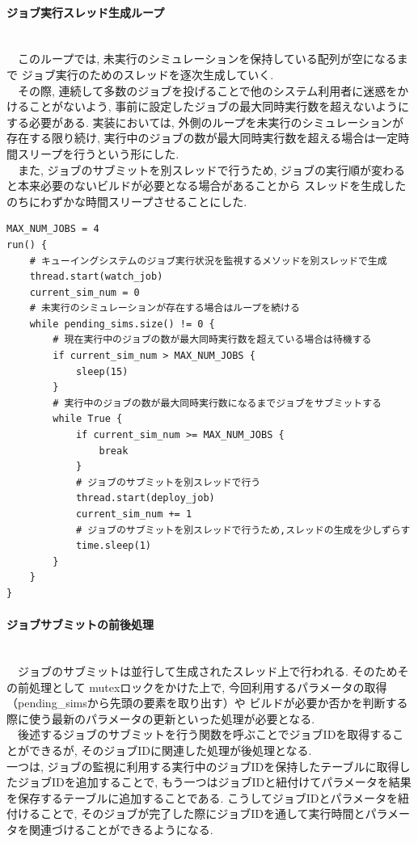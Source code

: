 \paragraph{ジョブ実行スレッド生成ループ}~\\
　このループでは, 未実行のシミュレーションを保持している配列が空になるまで
ジョブ実行のためのスレッドを逐次生成していく.\\
　その際, 連続して多数のジョブを投げることで他のシステム利用者に迷惑をかけることがないよう,
事前に設定したジョブの最大同時実行数を超えないようにする必要がある.
実装においては, 外側のループを未実行のシミュレーションが存在する限り続け,
実行中のジョブの数が最大同時実行数を超える場合は一定時間スリープを行うという形にした.\\
　また, ジョブのサブミットを別スレッドで行うため, ジョブの実行順が変わると本来必要のないビルドが必要となる場合があることから
スレッドを生成したのちにわずかな時間スリープさせることにした.\\

{\footnotesize
\begin{lstlisting}[title=ジョブ実行スレッドを生成するループ　疑似コード,frame=single]
MAX_NUM_JOBS = 4
run() {
    # キューイングシステムのジョブ実行状況を監視するメソッドを別スレッドで生成
    thread.start(watch_job)
    current_sim_num = 0
    # 未実行のシミュレーションが存在する場合はループを続ける
    while pending_sims.size() != 0 {
        # 現在実行中のジョブの数が最大同時実行数を超えている場合は待機する
        if current_sim_num > MAX_NUM_JOBS {
            sleep(15)
        }
        # 実行中のジョブの数が最大同時実行数になるまでジョブをサブミットする
        while True {
            if current_sim_num >= MAX_NUM_JOBS {
                break
            }
            # ジョブのサブミットを別スレッドで行う
            thread.start(deploy_job)
            current_sim_num += 1
            # ジョブのサブミットを別スレッドで行うため,スレッドの生成を少しずらす
            time.sleep(1)
        }
    }
}
\end{lstlisting}
}

\paragraph{ジョブサブミットの前後処理}~\\
　ジョブのサブミットは並行して生成されたスレッド上で行われる. そのためその前処理として
mutexロックをかけた上で, 今回利用するパラメータの取得（pending\_simsから先頭の要素を取り出す）や
ビルドが必要か否かを判断する際に使う最新のパラメータの更新といった処理が必要となる.\\
　後述するジョブのサブミットを行う関数を呼ぶことでジョブIDを取得することができるが, そのジョブIDに関連した処理が後処理となる.\\
一つは, ジョブの監視に利用する実行中のジョブIDを保持したテーブルに取得したジョブIDを追加することで,
もう一つはジョブIDと紐付けてパラメータを結果を保存するテーブルに追加することである. こうしてジョブIDとパラメータを紐付けることで, そのジョブが完了した際にジョブIDを通して実行時間とパラメータを関連づけることができるようになる.\\

